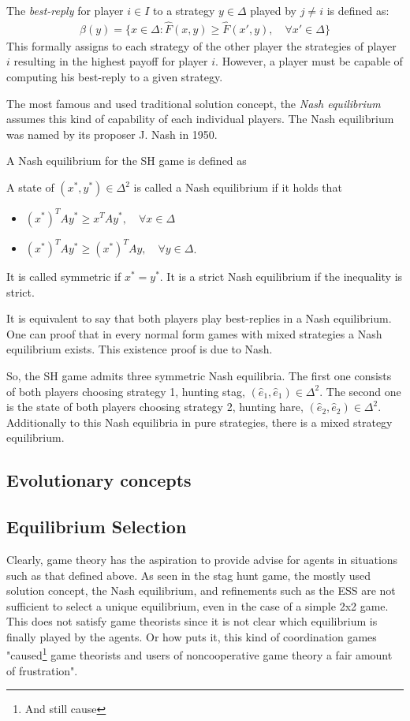 \documentclass[12pt]{article}
\begin{document}
The \textit{best-reply} for player $i \in I$ to a strategy $y \in \Delta$ 
played by $j \neq i$ is defined as:
\begin{align}
        \beta(y) = \{x \in \Delta: \hat{F}(x,y) \geq \hat{F}(x',y), 
        \quad \forall x' \in \Delta\}
\end{align}
This formally assigns to each strategy of the other player the strategies
of player $i$ resulting in the highest payoff for player $i$. However, a player
must be capable of computing his best-reply to a given strategy.

The most famous and used traditional solution concept, the \textit{Nash 
equilibrium} assumes this kind of capability of each individual players. 
The Nash equilibrium was named by its proposer J. Nash in 1950. 

A Nash equilibrium for the SH game is defined as
\begin{mydef}
        A state of $(x^*,y^*) \in \Delta^2$ is called a Nash equilibrium if 
        it holds that
\begin{itemize}
        \item   $(x^*)^T A y^* \geq x^T A y^*, \quad \forall x \in \Delta$
        \item   $(x^*)^T A y^* \geq (x^*)^T A y, \quad \forall y \in \Delta$.
\end{itemize}
It is called symmetric if $x^* = y^*$. It is a strict Nash equilibrium if 
the inequality is strict.
\end{mydef}
It is equivalent to say that both players play best-replies in a Nash 
equilibrium. One can proof that in every normal form games with mixed 
strategies a Nash equilibrium exists. This existence proof is due to Nash.

So, the SH game admits three symmetric Nash equilibria. The first one consists
of both players choosing strategy 1, hunting stag, $(\hat{e}_1,\hat{e}_1) \in
\Delta^2$. The second one is the state of 
both players choosing strategy 2, hunting hare, $(\hat{e}_2,\hat{e}_2)
\in \Delta^2$. Additionally to this Nash equilibria in pure strategies, there 
is a mixed strategy equilibrium. 
\subsection{Evolutionary concepts}

\subsection{Equilibrium Selection}
Clearly, game theory has the aspiration to provide advise for agents in 
situations such as that defined above.
As seen in the stag hunt game, the mostly used solution concept, 
the Nash equilibrium, and refinements such as the ESS are
not sufficient to select a unique equilibrium, even in the case of a simple
2x2 game. This does not satisfy game theorists since it is not clear which
equilibrium is finally played by the agents. Or how \cite{weibull} puts it,
this kind of coordination games "caused\footnote{And still cause} game theorists and users of 
noncooperative game theory a fair amount of frustration". 
\end{document}
